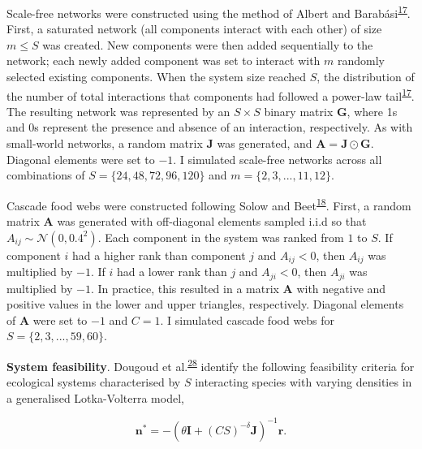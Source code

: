 \documentclass[]{article}
\begin{document}
Scale-free networks were constructed using the method of Albert and
Barabási\textsuperscript{\protect\hyperlink{ref-Albert2002}{17}}. First,
a saturated network (all components interact with each other) of size
\(m \leq S\) was created. New components were then added sequentially to
the network; each newly added component was set to interact with \(m\)
randomly selected existing components. When the system size reached
\(S\), the distribution of the number of total interactions that
components had followed a power-law
tail\textsuperscript{\protect\hyperlink{ref-Albert2002}{17}}. The
resulting network was represented by an \(S \times S\) binary matrix
\(\mathbf{G}\), where 1s and 0s represent the presence and absence of an
interaction, respectively. As with small-world networks, a random matrix
\(\mathbf{J}\) was generated, and
\(\mathbf{A} = \mathbf{J} \odot \mathbf{G}\). Diagonal elements were set
to \(-1\). I simulated scale-free networks across all combinations of
\(S = \{24, 48, 72, 96, 120\}\) and \(m = \{2, 3, ..., 11, 12\}\).

Cascade food webs were constructed following Solow and
Beet\textsuperscript{\protect\hyperlink{ref-Solow1998}{18}}. First, a
random matrix \(\mathbf{A}\) was generated with off-diagonal elements
sampled i.i.d so that \(A_{ij} \sim \mathcal{N}(0, 0.4^2)\). Each
component in the system was ranked from \(1\) to \(S\). If component
\(i\) had a higher rank than component \(j\) and \(A_{ij} < 0\), then
\(A_{ij}\) was multiplied by \(-1\). If \(i\) had a lower rank than
\(j\) and \(A_{ji} < 0\), then \(A_{ji}\) was multiplied by \(-1\). In
practice, this resulted in a matrix \(\mathbf{A}\) with negative and
positive values in the lower and upper triangles, respectively. Diagonal
elements of \(\mathbf{A}\) were set to \(-1\) and \(C = 1\). I simulated
cascade food webs for \(S = \{2, 3, ..., 59, 60\}\).

\textbf{System feasibility}. Dougoud et
al.\textsuperscript{\protect\hyperlink{ref-Dougoud2018}{28}} identify
the following feasibility criteria for ecological systems characterised
by \(S\) interacting species with varying densities in a generalised
Lotka-Volterra model,

\[\mathbf{n^{*}} = -\left(\theta \mathbf{I} + (CS)^{-\delta}\mathbf{J} \right)^{-1}\mathbf{r}.\]
\end{document}
